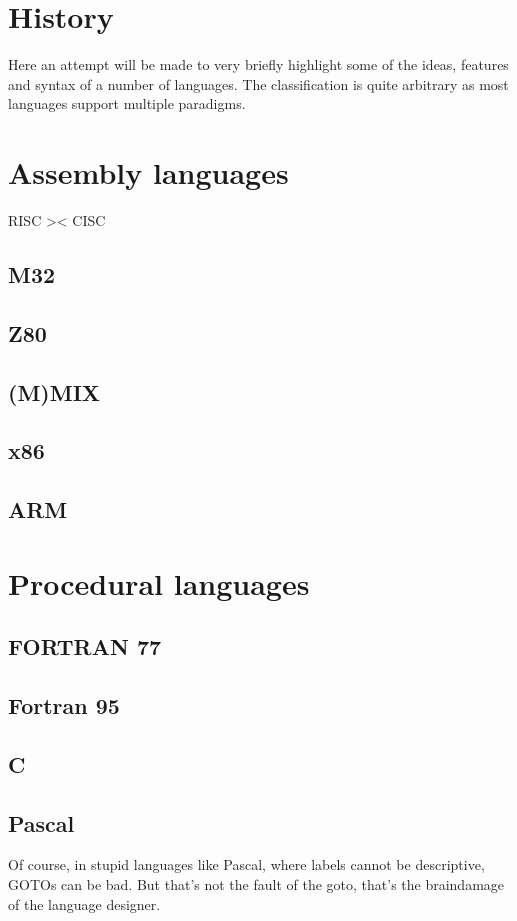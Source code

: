 \section{History}
Here an attempt will be made to very briefly highlight some of the ideas, features and syntax of a number of languages. The classification is quite arbitrary as most languages support multiple paradigms.
\section{Assembly languages}
RISC >< CISC
\subsection{M32}
\subsection{Z80}
\subsection{(M)MIX}
\subsection{x86}
\subsection{ARM}

\section{Procedural languages}
\subsection{FORTRAN 77}

\subsection{Fortran 95}

\subsection{C}
\subsection{Pascal}
Of course, in stupid languages like Pascal, where labels cannot be
descriptive, GOTOs can be bad. But that's not the fault of the goto,
that's the braindamage of the language designer.


